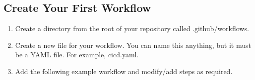 \documentclass[letterpaper,10pt,english]{jupyterBook}
\begin{document}
\subsection{Create Your First Workflow}
\label{\detokenize{chapter_12/ci_cd:create-your-first-workflow}}\begin{enumerate}
%
\item {} 
\sphinxAtStartPar
Create a directory from the root of your repository called
.github/workflows.

\item {} 
\sphinxAtStartPar
Create a new file for your workflow. You can name this anything, but
it must be a YAML file. For example, ci\sphinxhyphen{}cd.yaml.

\item {} 
\sphinxAtStartPar
Add the following example workflow and modify/add steps as required.

\end{enumerate}

\begin{sphinxVerbatim}[commandchars=\\\{\}]
 \PYGZbs{}
 \PYGZbs{}\PYG{p}{[}\PYGZbs{}\PYG{p}{]}\PYGZbs{}
\PYGZbs{}
\PYGZbs{}
 \PYGZbs{}
\PYGZbs{}
  \PYGZbs{}
  \PYGZbs{}
\PYGZbs{}
 \PYGZbs{}
\end{sphinxVerbatim}
\end{document}
